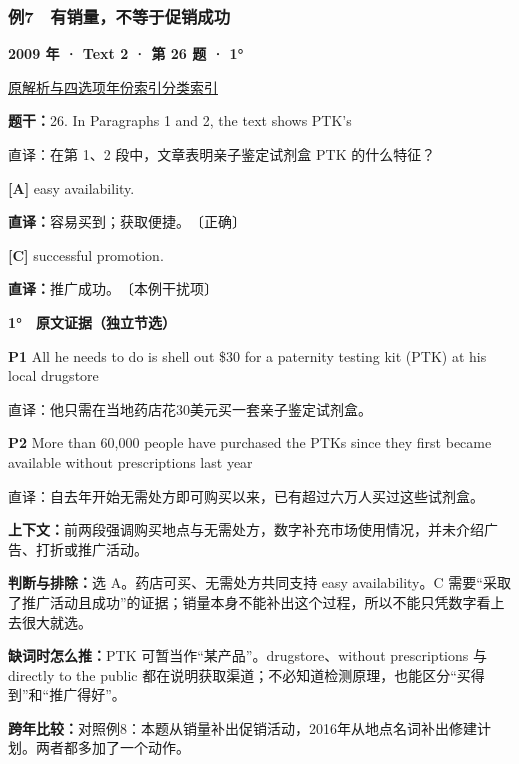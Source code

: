 \documentclass[11pt,a4paper]{article}
\begin{document}
\subsubsection{例7　有销量，不等于促销成功}\label{case-2009-T2-Q26}
\noindent\textbf{2009 年 · Text 2 · 第 26 题 · 1°}\par\noindent \href{https://zj139.github.io/math-notes/english/35e7c30a863ed5433f61ed2e/\#q26}{原解析与四选项}\quad \hyperref[idx-2009-T2-Q26]{年份索引}\quad \hyperref[class-R04]{分类索引}\par\smallskip
\noindent\textbf{题干：}26. In Paragraphs 1 and 2, the text shows PTK's\par
直译：在第 1、2 段中，文章表明亲子鉴定试剂盒 PTK 的什么特征？\par
{}\noindent\textbf{[A]} easy availability.\par\nopagebreak
\noindent\textbf{直译：}容易买到；获取便捷。　〔正确〕\par
{}\noindent\textbf{[C]} successful promotion.\par\nopagebreak
\noindent\textbf{直译：}推广成功。　〔本例干扰项〕\par
\begin{evidence}\textbf{1°　原文证据（独立节选）}\par
\textbf{P1} All he needs to do is shell out \$30 for a paternity testing kit (PTK) at his local drugstore\par 直译：他只需在当地药店花30美元买一套亲子鉴定试剂盒。\par
\textbf{P2} More than 60,000 people have purchased the PTKs since they first became available without prescriptions last year\par 直译：自去年开始无需处方即可购买以来，已有超过六万人买过这些试剂盒。\par
\end{evidence}
\noindent\textbf{上下文：}前两段强调购买地点与无需处方，数字补充市场使用情况，并未介绍广告、打折或推广活动。\par
\noindent\textbf{判断与排除：}选 A。药店可买、无需处方共同支持 easy availability。C 需要“采取了推广活动且成功”的证据；销量本身不能补出这个过程，所以不能只凭数字看上去很大就选。\par
\noindent\textbf{缺词时怎么推：}PTK 可暂当作“某产品”。drugstore、without prescriptions 与 directly to the public 都在说明获取渠道；不必知道检测原理，也能区分“买得到”和“推广得好”。\par
\noindent\textbf{跨年比较：}对照例8：本题从销量补出促销活动，2016年从地点名词补出修建计划。两者都多加了一个动作。\par
\clearpage
\end{document}
